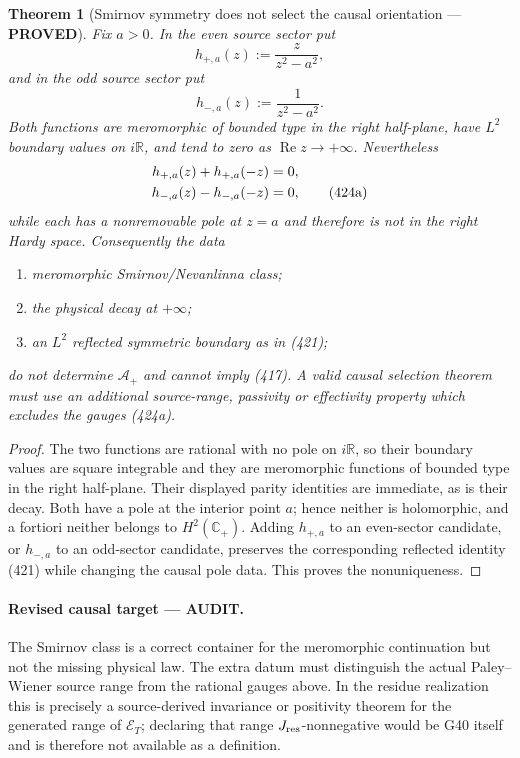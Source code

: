 \documentclass[11pt]{article}
\newtheorem{theorem}{Theorem}
\newcommand{\PROVED}{\textcolor{green!45!black}{\textbf{PROVED}}}
\newcommand{\AUDIT}{\textcolor{orange!75!black}{\textbf{AUDIT}}}
\begin{document}
\begin{theorem}[Smirnov symmetry does not select the causal orientation
--- \PROVED]
Fix \(a>0\).  In the even source sector put
\[
 h_{+,a}(z):=\frac{z}{z^2-a^2},
\]
and in the odd source sector put
\[
 h_{-,a}(z):=\frac{1}{z^2-a^2}.
\]
Both functions are meromorphic of bounded type in the right half-plane,
have \(L^2\) boundary values on \(i\mathbb R\), and tend to zero as
\(\operatorname{Re}z\to+\infty\).  Nevertheless
\begin{align}
 h_{+,a}(z)+h_{+,a}(-z)&=0,\notag\\
 h_{-,a}(z)-h_{-,a}(-z)&=0,                           \tag{424a}
\end{align}
while each has a nonremovable pole at \(z=a\) and therefore is not in the
right Hardy space.  Consequently the data
\begin{enumerate}
\item meromorphic Smirnov/Nevanlinna class;
\item the physical decay at \(+\infty\);
\item an \(L^2\) reflected symmetric boundary as in (421);
\end{enumerate}
do not determine \(\mathscr A_+\) and cannot imply (417).  A valid causal
selection theorem must use an additional source-range, passivity or
effectivity property which excludes the gauges (424a).
\end{theorem}

\begin{proof}
The two functions are rational with no pole on \(i\mathbb R\), so their
boundary values are square integrable and they are meromorphic functions of
bounded type in the right half-plane.  Their displayed parity identities
are immediate, as is their decay.  Both have a pole at the interior point
\(a\); hence neither is holomorphic, and a fortiori neither belongs to
\(H^2(\mathbb C_+)\).  Adding \(h_{+,a}\) to an even-sector candidate, or
\(h_{-,a}\) to an odd-sector candidate, preserves the corresponding
reflected identity (421) while changing the causal pole data.  This proves
the nonuniqueness.
\end{proof}

\paragraph{Revised causal target --- \AUDIT.}
The Smirnov class is a correct container for the meromorphic continuation
but not the missing physical law.  The extra datum must distinguish the
actual Paley--Wiener source range from the rational gauges above.  In the
residue realization this is precisely a source-derived invariance or
positivity theorem for the generated range of \(\mathcal E_T\); declaring
that range \(J_{\rm res}\)-nonnegative would be G40 itself and is therefore
not available as a definition.
\end{document}
